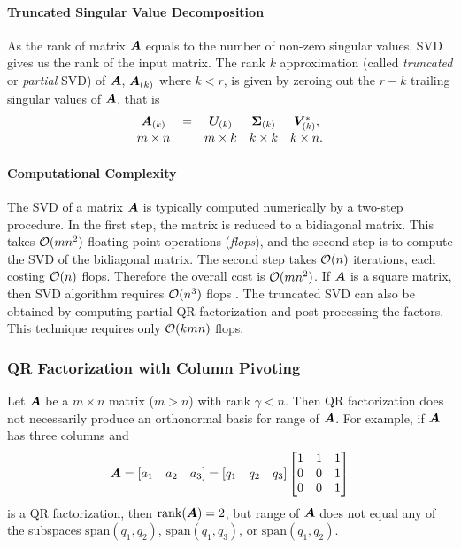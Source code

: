 \documentclass[12pt]{article}
\begin{document}
\paragraph{Truncated Singular Value Decomposition}
As the rank of matrix $\bm{A}$ equals to the number of non-zero singular values, SVD gives us the rank of the input matrix. The rank $k$ approximation (called \textit{truncated} or \textit{partial} SVD) of $\bm{A}$, $\bm{A}_{(k)}$ where $k<r$, is given by zeroing out the $r-k$ trailing singular values of $\bm{A}$, that is
\begin{equation}
\label{eq:tsvd}
\begin{array}{ccccccccccc}
\bm{A}_{(k)} &=& \bm{U}_{(k)} & \bm{\Sigma}_{(k)} & \bm{V}_{(k)}^{*},\\
m \times n && m \times k & k \times k & k \times n.
\end{array}
\end{equation}

\paragraph{Computational Complexity}
The SVD of a matrix $\bm{A}$ is typically computed numerically by a two-step procedure. In the first step, the matrix is reduced to a bidiagonal matrix. This takes $\mathcal{O}(mn^{2})$ floating-point operations (\textit{flops}), and the second step is to compute the SVD of the bidiagonal matrix. The second step takes $\mathcal{O}(n)$ iterations, each costing $\mathcal{O}(n)$ flops. Therefore the overall cost is $\mathcal{O}(mn^{2})$. If $\bm{A}$ is a square matrix, then SVD algorithm requires $\mathcal{O}(n^{3})$ flops \cite{golubvan,trefthenbau}. The truncated SVD can also be obtained by computing partial QR factorization and post-processing the factors. %
This technique requires only $\mathcal{O}(kmn)$ flops.

\subsubsection{QR Factorization with Column Pivoting}
\label{sec:qrf}

Let $\bm{A}$ be a $m \times n$ matrix ($m>n$) with rank $\gamma < n$. Then QR factorization does not necessarily produce an orthonormal basis for range of $\bm{A}$. For example, if $\bm{A}$ has three columns and
\[
\bm{A} = [a_1~~~a_2~~~a_3] = [q_1~~~q_2~~~q_3] 
\begin{bmatrix}
1 & 1 & 1 \\
0 & 0 & 1 \\
0 & 0 & 1
\end{bmatrix}
\]
is a QR factorization, then $\mathrm{rank}(\bm{A}) = 2$, but range of $\bm{A}$ does not equal any of the subspaces $\mathrm{span}(q_1, q_2)$, $\mathrm{span}(q_1, q_3)$, or $\mathrm{span}(q_1, q_2)$.
\end{document}
